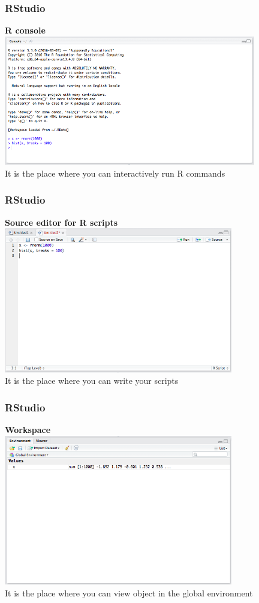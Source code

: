 \documentclass{beamer}
\begin{document}
\begin{frame}
	\frametitle{RStudio}
	\textbf{R console}\\
	\vspace{20pt}
	\centering \includegraphics[width=11cm]{figures/RStudio_console.png}\\
	\small It is the place where you can interactively run R commands
\end{frame}

\begin{frame}
	\frametitle{RStudio}
	\textbf{Source editor for R scripts}\\
	\vspace{20pt}
	\centering \includegraphics[width=10cm]{figures/RStudio_script.png}\\
	\small It is the place where you can write your scripts
\end{frame}

\begin{frame}
	\frametitle{RStudio}
	\textbf{Workspace}\\
	\vspace{16pt}
	\centering \includegraphics[width=10cm]{figures/RStudio_environment.png}\\
	\small It is the place where you can view object in the global environment
\end{frame}
\end{document}

